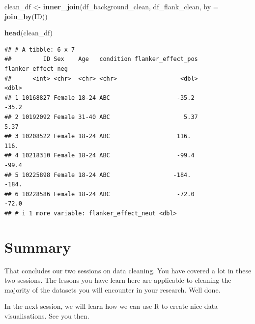 \documentclass[
]{book}
\newenvironment{Shaded}{\begin{snugshade}}{\end{snugshade}}
\newcommand{\AttributeTok}[1]{\textcolor[rgb]{0.13,0.29,0.53}{#1}}
\newcommand{\FunctionTok}[1]{\textcolor[rgb]{0.13,0.29,0.53}{\textbf{#1}}}
\newcommand{\NormalTok}[1]{#1}
\newcommand{\OtherTok}[1]{\textcolor[rgb]{0.56,0.35,0.01}{#1}}
\begin{document}
\begin{Shaded}
\begin{Highlighting}[]
\NormalTok{clean\_df }\OtherTok{\textless{}{-}} \FunctionTok{inner\_join}\NormalTok{(df\_background\_clean, df\_flank\_clean, }\AttributeTok{by =} \FunctionTok{join\_by}\NormalTok{(ID))}

\FunctionTok{head}\NormalTok{(clean\_df)}
\end{Highlighting}
\end{Shaded}

\begin{verbatim}
## # A tibble: 6 x 7
##         ID Sex    Age   condition flanker_effect_pos flanker_effect_neg
##      <int> <chr>  <chr> <chr>                  <dbl>              <dbl>
## 1 10168827 Female 18-24 ABC                   -35.2              -35.2 
## 2 10192092 Female 31-40 ABC                     5.37               5.37
## 3 10208522 Female 18-24 ABC                   116.               116.  
## 4 10218310 Female 18-24 ABC                   -99.4              -99.4 
## 5 10225898 Female 18-24 ABC                  -184.              -184.  
## 6 10228586 Female 18-24 ABC                   -72.0              -72.0 
## # i 1 more variable: flanker_effect_neut <dbl>
\end{verbatim}

\section{Summary}\label{summary-8}

That concludes our two sessions on data cleaning. You have covered a lot in these two sessions. The lessons you have learn here are applicable to cleaning the majority of the datasets you will encounter in your research. Well done.

In the next session, we will learn how we can use R to create nice data visualisations. See you then.

  
\end{document}

